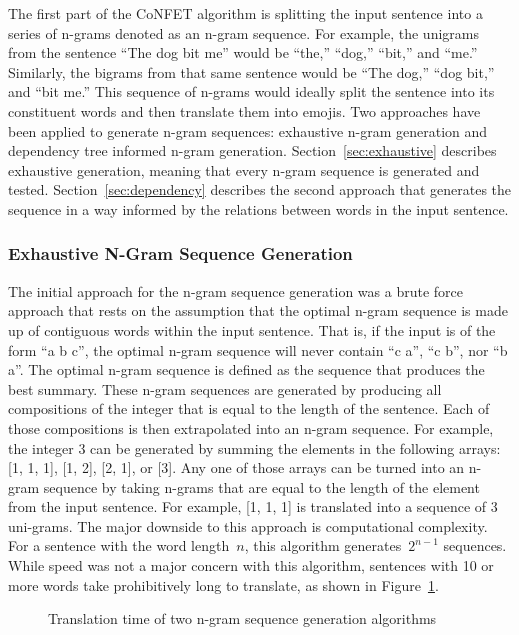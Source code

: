 \documentclass{article}[10]
\begin{document}
The first part of the CoNFET algorithm is splitting the input sentence into a
series of n-grams denoted as an n-gram sequence. For example, the unigrams from
the sentence ``The dog bit me'' would be ``the,'' ``dog,'' ``bit,'' and ``me.''
Similarly, the bigrams from that same sentence would be ``The dog,'' ``dog
bit,'' and ``bit me.'' This sequence of n-grams would ideally split the sentence
into its constituent words and then translate them into emojis. Two approaches
have been applied to generate n-gram sequences: exhaustive n-gram generation and
dependency tree informed n-gram generation. Section~\ref{sec:exhaustive}
describes exhaustive generation, meaning that every n-gram sequence is generated
and tested. Section~\ref{sec:dependency} describes the second approach that
generates the sequence in a way informed by the relations between words in the
input sentence.

\subsubsection{Exhaustive N-Gram Sequence Generation\label{sec:exhaustive}}

The initial approach for the n-gram sequence generation was a brute force
approach that rests on the assumption that the optimal n-gram sequence is made
up of contiguous words within the input sentence. That is, if the input is of
the form ``a b c'', the optimal n-gram sequence will never contain ``c a'', ``c b'', nor ``b a''. The optimal n-gram sequence is defined as the sequence that
produces the best summary. These n-gram sequences are generated by producing all
compositions of the integer that is equal to the length of the sentence. Each of
those compositions is then extrapolated into an n-gram sequence. For example,
the integer 3 can be generated by summing the elements in the following arrays:
[1, 1, 1], [1, 2], [2, 1], or [3]. Any one of those arrays can be turned into an
n-gram sequence by taking n-grams that are equal to the length of the element
from the input sentence. For example, [1, 1, 1] is translated into a sequence of
3 uni-grams. The major downside to this approach is computational complexity.
For a sentence with the word length~\(n\), this algorithm generates~\(2^{n-1}\)
sequences. While speed was not a major concern with this algorithm, sentences
with 10 or more words take prohibitively long to translate, as shown in
Figure~\ref{fig:timing}.

\begin{figure}[h]
  \begin{center}
    \scalebox{0.6}{}
    \caption{Translation time of two n-gram sequence generation
      algorithms\label{fig:timing}}
  \end{center}
\end{figure}
\end{document}
